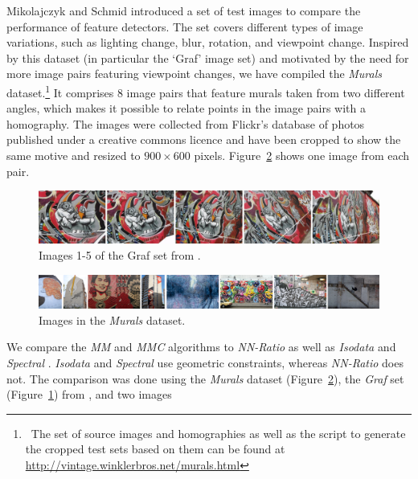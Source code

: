 \documentclass[conference]{IEEEtran}
\begin{document}
Mikolajczyk and Schmid  \cite{mikolajczyk2005performance} introduced a set of test images
to compare the performance of feature detectors. The 
set covers different types of image variations, such as lighting change, 
blur, rotation, and viewpoint change. Inspired by this 
dataset (in particular the `Graf' image set) and motivated by 
the need for more image pairs featuring viewpoint changes, we have 
compiled the \emph{Murals} dataset.\footnote{~The set of source images and homographies as well as 
the script to generate the cropped test sets based on them can be found 
at \url{http://vintage.winklerbros.net/murals.html}} It comprises 8 image pairs that feature murals taken from two 
different angles, which makes it possible to relate points in the image pairs with a 
homography.  The images were collected from Flickr's database of 
photos published under a creative commons licence and have been cropped to show the same motive and 
resized to $900\times 600$ pixels.  Figure~\ref{fig:murals} shows one image from each pair.

\begin{figure}[htb]
	\centering
	\includegraphics[width=\columnwidth]{images/graf12345.jpg}
	\caption{Images 1-5 of the Graf set from \cite{mikolajczyk2005performance}.}
	\label{fig:Graf}
\end{figure}

\begin{figure}[t]
	\centering
	\includegraphics[width=\textwidth]{images/murals}
	\caption{Images in the \emph{Murals} dataset.}
	\label{fig:murals}
\end{figure}

We compare the \emph{MM} and \emph{MMC} algorithms to \emph{NN-Ratio} 
\cite{lowe2004sift} as well as \emph{Isodata} \cite{das2008event} and 
\emph{Spectral} \cite{leordeanu2005spectral}.  \emph{Isodata} and 
\emph{Spectral} use geometric constraints, whereas \emph{NN-Ratio} does 
not. The comparison was done using the \emph{Murals} dataset 
(Figure~\ref{fig:murals}), the \emph{Graf} set (Figure~\ref{fig:Graf}) 
from \cite{mikolajczyk2005performance}, and two images 
\end{document}
